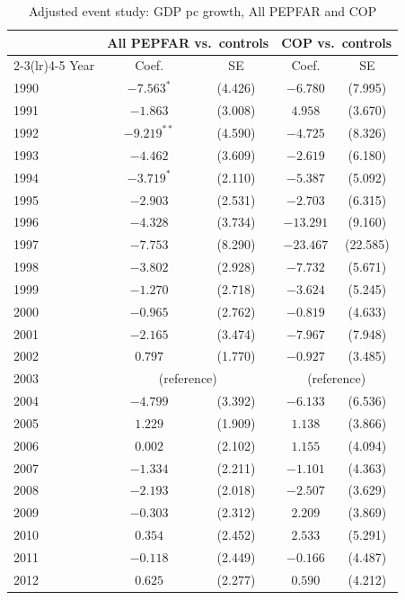\begin{table}[htbp]
\centering
\small
\caption{Adjusted event study: GDP pc growth, All PEPFAR and COP}
\label{tab:es_combined_gdp_pc_growth}
\begin{tabular}{lcccc}
\toprule
 & \multicolumn{2}{c}{All PEPFAR vs.\ controls} & \multicolumn{2}{c}{COP vs.\ controls} \\
\cmidrule(lr){2-3}\cmidrule(lr){4-5}
Year & Coef. & SE & Coef. & SE \\
\midrule
1990 & $-7.563^{*}$ & (4.426) & $-6.780$ & (7.995) \\
1991 & $-1.863$ & (3.008) & $4.958$ & (3.670) \\
1992 & $-9.219^{**}$ & (4.590) & $-4.725$ & (8.326) \\
1993 & $-4.462$ & (3.609) & $-2.619$ & (6.180) \\
1994 & $-3.719^{*}$ & (2.110) & $-5.387$ & (5.092) \\
1995 & $-2.903$ & (2.531) & $-2.703$ & (6.315) \\
1996 & $-4.328$ & (3.734) & $-13.291$ & (9.160) \\
1997 & $-7.753$ & (8.290) & $-23.467$ & (22.585) \\
1998 & $-3.802$ & (2.928) & $-7.732$ & (5.671) \\
1999 & $-1.270$ & (2.718) & $-3.624$ & (5.245) \\
2000 & $-0.965$ & (2.762) & $-0.819$ & (4.633) \\
2001 & $-2.165$ & (3.474) & $-7.967$ & (7.948) \\
2002 & $0.797$ & (1.770) & $-0.927$ & (3.485) \\
2003 & \multicolumn{2}{c}{(reference)} & \multicolumn{2}{c}{(reference)} \\
2004 & $-4.799$ & (3.392) & $-6.133$ & (6.536) \\
2005 & $1.229$ & (1.909) & $1.138$ & (3.866) \\
2006 & $0.002$ & (2.102) & $1.155$ & (4.094) \\
2007 & $-1.334$ & (2.211) & $-1.101$ & (4.363) \\
2008 & $-2.193$ & (2.018) & $-2.507$ & (3.629) \\
2009 & $-0.303$ & (2.312) & $2.209$ & (3.869) \\
2010 & $0.354$ & (2.452) & $2.533$ & (5.291) \\
2011 & $-0.118$ & (2.449) & $-0.166$ & (4.487) \\
2012 & $0.625$ & (2.277) & $0.590$ & (4.212) \\

\end{tabular}
\end{table}
